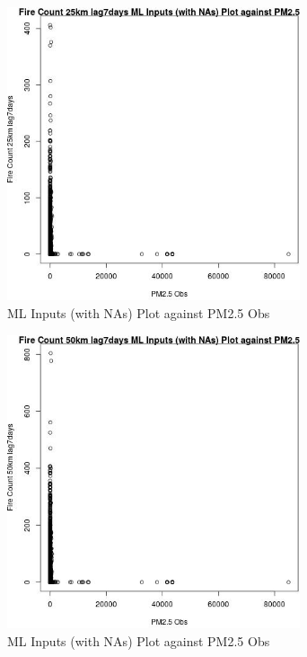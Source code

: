 \begin{figure} 
\centering  
\includegraphics[width=0.77\textwidth]{Code_Outputs/Report_ML_input_PM25_Step4_part_f_de_duplicated_aves_prioritize_24hr_obswNAs_Fire_Count_25km_lag7daysvPM25_Obs.jpg} 
\caption{\label{fig:Report_ML_input_PM25_Step4_part_f_de_duplicated_aves_prioritize_24hr_obswNAsFire_Count_25km_lag7daysvPM25_Obs}ML Inputs (with NAs) Plot against PM2.5 Obs} 
\end{figure} 
 

\clearpage 

\begin{figure} 
\centering  
\includegraphics[width=0.77\textwidth]{Code_Outputs/Report_ML_input_PM25_Step4_part_f_de_duplicated_aves_prioritize_24hr_obswNAs_Fire_Count_50km_lag7daysvPM25_Obs.jpg} 
\caption{\label{fig:Report_ML_input_PM25_Step4_part_f_de_duplicated_aves_prioritize_24hr_obswNAsFire_Count_50km_lag7daysvPM25_Obs}ML Inputs (with NAs) Plot against PM2.5 Obs} 
\end{figure} 
 

